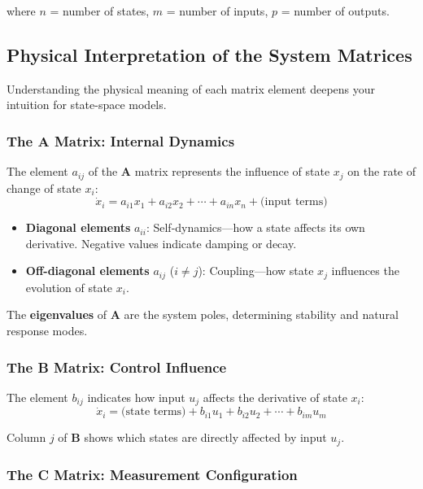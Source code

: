 where $n$ = number of states, $m$ = number of inputs, $p$ = number of outputs.

\subsection{Physical Interpretation of the System Matrices}

Understanding the physical meaning of each matrix element deepens your intuition for state-space models.

\subsubsection{The A Matrix: Internal Dynamics}

The element $a_{ij}$ of the $\mathbf{A}$ matrix represents the influence of state $x_j$ on the rate of change of state $x_i$:
\begin{equation}
\dot{x}_i = a_{i1}x_1 + a_{i2}x_2 + \cdots + a_{in}x_n + \text{(input terms)}
\end{equation}

\begin{itemize}
    \item \textbf{Diagonal elements} $a_{ii}$: Self-dynamics---how a state affects its own derivative. Negative values indicate damping or decay.
    \item \textbf{Off-diagonal elements} $a_{ij}$ ($i \neq j$): Coupling---how state $x_j$ influences the evolution of state $x_i$.
\end{itemize}

The \textbf{eigenvalues} of $\mathbf{A}$ are the system poles, determining stability and natural response modes.

\subsubsection{The B Matrix: Control Influence}

The element $b_{ij}$ indicates how input $u_j$ affects the derivative of state $x_i$:
\begin{equation}
\dot{x}_i = \text{(state terms)} + b_{i1}u_1 + b_{i2}u_2 + \cdots + b_{im}u_m
\end{equation}

Column $j$ of $\mathbf{B}$ shows which states are directly affected by input $u_j$.

\subsubsection{The C Matrix: Measurement Configuration}

